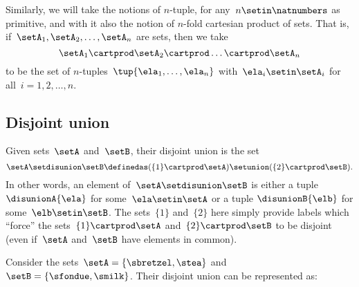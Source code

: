 Similarly, we will take the notions of $n$-tuple, for any~$n \setin\natnumbers$ as primitive, and with it also the notion of $n$-fold cartesian product of sets.
That is, if~$\setA_1, \setA_2, \ldots, \setA_n$ are sets, then we take
\begin{equation*}
    \setA_1 \cartprod \setA_2 \cartprod \dots \cartprod \setA_n
\end{equation*}
to be the set of $n$-tuples~$\tup{\ela_1, \ldots, \ela_n}$ with~$\ela_i \setin\setA_i$ for all~$i = 1,2,\ldots,n$.

\subsection{Disjoint union}
\label{sec:disjoint-union}

Given sets~$\setA$ and~$\setB$, their disjoint union is the set
\begin{equation*}
    \setA \setdisunion \setB \definedas (  \{ 1 \} \cartprod \setA) \setunion ( \{2\}  \cartprod \setB).
\end{equation*}
In other words, an element of~$\setA \setdisunion \setB$ is either a tuple~$\disunionA{\ela}$ for some~$\ela \setin\setA$ or a tuple $\disunionB{\elb}$ for some~$\elb \setin\setB$.
The sets~$\{ 1 \}$ and~$\{2\}$ here simply provide labels which ``force'' the sets~$\{ 1 \}  \cartprod \setA$ and~$ \{2\}  \cartprod \setB$ to be disjoint (even if~$\setA$ and~$\setB$ have elements in common).



Consider the sets~$\setA=\{\sbretzel, \stea\}$ and~$\setB=\{\sfondue, \smilk\}$.
Their disjoint union can be represented as:

